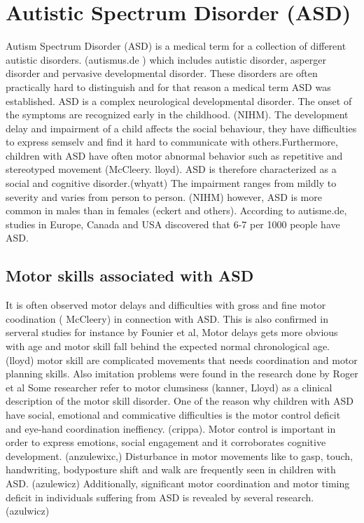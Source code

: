 \section{Autistic Spectrum Disorder (ASD)}
\label{sec:asd}

Autism Spectrum Disorder (ASD) is a medical term for a collection of different autistic disorders. (autismus.de ) which includes autistic disorder, asperger disorder and pervasive developmental disorder. These disorders are often practically hard to distinguish and for that reason a medical term ASD was established.  ASD is a complex neurological developmental disorder. The onset of the symptoms are recognized early in the childhood. (NIHM). The development delay and impairment of a child affects the social behaviour, they have difficulties to express semselv and find it hard to communicate with others.Furthermore, children with ASD have often motor abnormal behavior such as repetitive and stereotyped movement (McCleery. lloyd).  ASD is therefore characterized as a social and cognitive disorder.(whyatt) The impairment ranges from mildly to severity and varies from person to person. (NIHM) however, ASD is more common in males than in females (eckert and others). According to autisme.de, studies in Europe, Canada and USA discovered that 6-7 per 1000 people have ASD. 



\subsection{Motor skills associated with ASD}

It is often observed motor delays and difficulties with gross and fine motor coodination ( McCleery) in connection with ASD.  This is also confirmed in serveral studies for instance by Founier et al, Motor delays gets more obvious with age and motor skill fall behind the expected normal chronological age. (lloyd) motor skill are complicated movements that needs coordination and motor planning skills. 
Also imitation problems were found in the research done by  Roger et al
Some researcher refer to motor clumsiness (kanner, Lloyd) as a clinical description of the motor skill disorder.
One of the reason why children with ASD have social, emotional and commicative difficulties is the motor control deficit and eye-hand coordination ineffiency. (crippa). Motor control is important in order to express emotions, social engagement and it corroborates cognitive development. (anzulewixc,) 
Disturbance in motor movements like to gasp, touch, handwriting, bodyposture shift and walk are frequently seen in children with ASD. (azulewicz) Additionally, significant motor coordination and motor timing deficit in individuals suffering from ASD is revealed by several research. (azulwicz)

